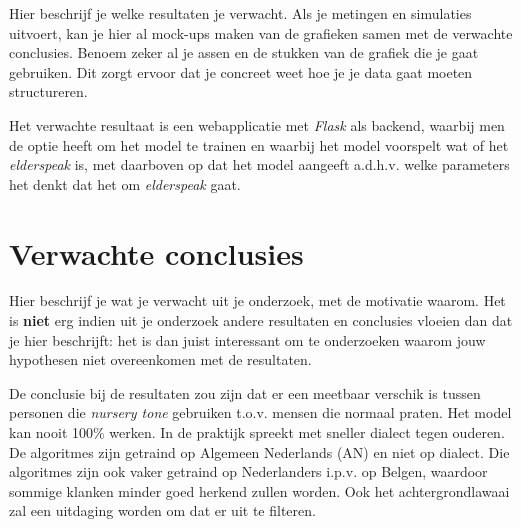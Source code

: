 Hier beschrijf je welke resultaten je verwacht. Als je metingen en simulaties uitvoert, kan je hier al mock-ups maken van de grafieken samen met de verwachte conclusies. Benoem zeker al je assen en de stukken van de grafiek die je gaat gebruiken. Dit zorgt ervoor dat je concreet weet hoe je je data gaat moeten structureren.

Het verwachte resultaat is een webapplicatie met \textit{Flask} als backend, waarbij men de optie heeft om het model te trainen en waarbij het model voorspelt wat of het \textit{elderspeak} is, met daarboven op dat het model aangeeft a.d.h.v. welke parameters het denkt dat het om \textit{elderspeak} gaat.


\section{Verwachte conclusies}
\label{sec:verwachte_conclusies}

Hier beschrijf je wat je verwacht uit je onderzoek, met de motivatie waarom. Het is \textbf{niet} erg indien uit je onderzoek andere resultaten en conclusies vloeien dan dat je hier beschrijft: het is dan juist interessant om te onderzoeken waarom jouw hypothesen niet overeenkomen met de resultaten.

De conclusie bij de resultaten zou zijn dat er een meetbaar verschik is tussen personen die \textit{nursery tone} gebruiken t.o.v. mensen die normaal praten. Het model kan nooit 100\% werken. In de praktijk spreekt met sneller dialect tegen ouderen. De algoritmes zijn getraind op Algemeen Nederlands (AN) en niet op dialect. Die algoritmes zijn ook vaker getraind op Nederlanders i.p.v. op Belgen, waardoor sommige klanken minder goed herkend zullen worden. Ook het achtergrondlawaai zal een uitdaging worden om dat er uit te filteren.

